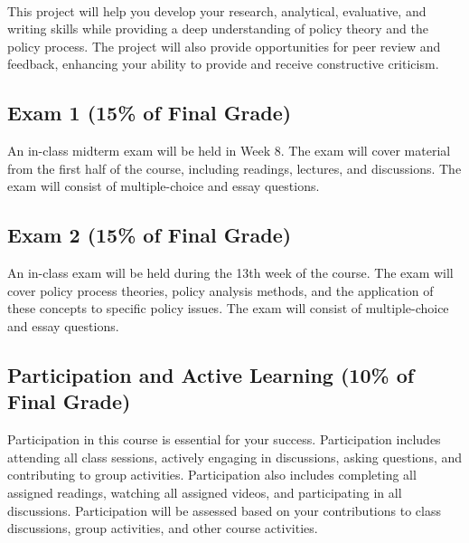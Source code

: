 \documentclass[11pt, letterpaper]{article}
\begin{document}
\paragraph{} This project will help you develop your research, analytical, evaluative, and writing skills while providing a deep understanding of policy theory and the policy process. The project will also provide opportunities for peer review and feedback, enhancing your ability to provide and receive constructive criticism.

\subsection*{Exam 1 (15\% of Final Grade)}
An in-class midterm exam will be held in Week 8. The exam will cover material from the first half of the course, including readings, lectures, and discussions. The exam will consist of multiple-choice and essay questions.

\subsection*{Exam 2 (15\% of Final Grade)}
An in-class exam will be held during the 13th week of the course. The exam will cover policy process theories, policy analysis methods, and the application of these concepts to specific policy issues. The exam will consist of multiple-choice and essay questions.

\subsection*{Participation and Active Learning (10\% of Final Grade)}
Participation in this course is essential for your success. Participation includes attending all class sessions, actively engaging in discussions, asking questions, and contributing to group activities. Participation also includes completing all assigned readings, watching all assigned videos, and participating in all discussions. Participation will be assessed based on your contributions to class discussions, group activities, and other course activities.
\end{document}
